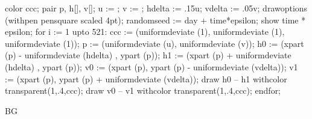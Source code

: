color ccc;
pair p, h[], v[];
u := \overlaywidth; v := \overlayheight;
hdelta := .15u; vdelta := .05v;
drawoptions (withpen pensquare scaled 4pt);
randomseed := day + time*epsilon;
show time * epsilon;
for i := 1 upto 521:
    ccc := (uniformdeviate (1), uniformdeviate (1), uniformdeviate (1));
    p := (uniformdeviate (u), uniformdeviate (v));
    h0 := (xpart (p) - uniformdeviate (hdelta) , ypart (p));
    h1 := (xpart (p) + uniformdeviate (hdelta) , ypart (p));
    v0 := (xpart (p), ypart (p) - uniformdeviate (vdelta));
    v1 := (xpart (p), ypart (p) + uniformdeviate (vdelta));
    draw h0 -- h1 withcolor transparent(1,.4,ccc);
    draw v0 -- v1 withcolor transparent(1,.4,ccc);
endfor;
\stopuseMPgraphic

\startsetups BG
\setupbackgrounds[page][background=bg]
\stopsetups
{}

\startBG
\startstandardmakeup
\setuplayout[cover]
\vfill
\stopstandardmakeup
\stopBG